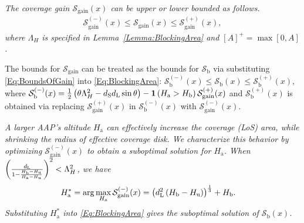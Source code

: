 \documentclass[12pt, draftclsnofoot, onecolumn]{IEEEtran}
\begin{document}
\begin{lemma}\label{Lemma:BoundsOfCoverageGain}\emph{The coverage gain $\mathcal{S}_{\textrm{gain}}(x)$ can be upper or lower bounded as follows.
\begin{align}\label{Eq:BoundsOfGain}
\mathcal{S}_{\textrm{gain}}^{(-)}(x) \leq \mathcal{S}_{\textrm{gain}}(x) \leq \mathcal{S}_{\textrm{gain}}^{(+)}(x),
\end{align}
where $\Lambda_H$ is specified in Lemma~\ref{Lemma:BlockingArea} and $[A]^{+} = \max[0, A]$.}
\end{lemma}
The bounds for $\mathcal{S}_{\mathrm{gain}}$  can be treated as the bounds for $\mathcal{S}_{\mathrm{b}}$ via substituting \eqref{Eq:BoundsOfGain} into \eqref{Eq:BlockingArea}: $\mathcal{S}_{\textrm{b}}^{(-)}(x)\leq \mathcal{S}_{\textrm{b}}(x) \leq \mathcal{S}_{\textrm{b}}^{(+)}(x)$, where $\mathcal{S}_{\textrm{b}}^{(-)}(x) = \frac{1}{2}\left(\theta \Lambda_H^2  - d_{\textrm{S}}d_{\textrm{L}}\sin\theta\right) - \mathbf{1}\left( H_{\textrm{a}} > H_{\textrm{b}} \right)\mathcal{S}_{\textrm{gain}}^{(+)}(x)$ and $\mathcal{S}_{\textrm{b}}^{(+)}(x)$ is obtained via replacing $\mathcal{S}_{\textrm{gain}}^{(+)}(x)$ in $\mathcal{S}_{\textrm{b}}^{(-)}(x)$ with $\mathcal{S}_{\textrm{gain}}^{(-)}(x)$.
\begin{remark}\label{Remark:OptimalAAPAltitude}\emph{A larger AAP's altitude $H_{\mathrm{a}}$ can effectively increase the coverage (LoS) area, while shrinking the radius of effective coverage disk. We characterize this behavior by optimizing $\mathcal{S}_{\textrm{gain}}^{(-)}(x)$ to obtain a suboptimal solution for $H_{\mathrm{a}}$. When $\left( \frac{d_{\textrm{L}}}{1 -  \frac{H_{\mathrm{b}} - H_{\mathrm{u}}}{H_{\mathrm{a}} - H_{\mathrm{u}}}} \right)^2  < \Lambda_H^2$, we have
\begin{align}\label{Eq:SubOptimalGain}
H_{\mathrm{a}}^{*} &= \arg \max_{H_{\mathrm{a}}} \mathcal{S}_{\textrm{gain}}^{(-)}(x) = \left(d_{\textrm{L}}^2\left( H_{\mathrm{b}} - H_{\mathrm{u}} \right)  \right)^{\frac{1}{3}} + H_{\mathrm{b}}.
\end{align}
Substituting $H_{\mathrm{a}}^{*}$ into \eqref{Eq:BlockingArea} gives the suboptimal solution of $\mathcal{S}_\mathrm{b}(x)$.}
\end{remark}
\end{document}
